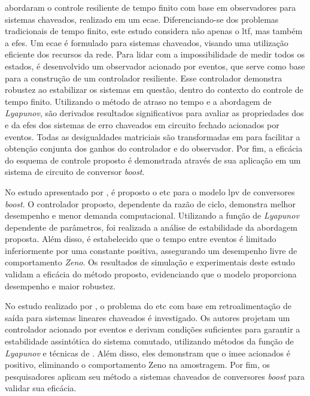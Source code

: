 \cite{Ren2018} abordaram o controle resiliente de tempo finito com base em observadores para sistemas chaveados, realizado em um \acrfull{ecae}. Diferenciando-se dos problemas tradicionais de tempo finito, este estudo considera não apenas o \acrfull{ltf}, mas também a \acrfull{efes}. Um \acrshort{ecae} é formulado para sistemas chaveados, visando uma utilização eficiente dos recursos da rede. Para lidar com a impossibilidade de medir todos os estados, é desenvolvido um observador acionado por eventos, que serve como base para a construção de um controlador resiliente. Esse controlador demonstra robustez ao estabilizar os sistemas em questão, dentro do contexto do controle de tempo finito. Utilizando o método de atraso no tempo e a abordagem de \textit{Lyapunov}, são derivados resultados significativos para avaliar as propriedades dos  e da \acrshort{efes} dos sistemas de erro chaveados em circuito fechado acionados por eventos. Todas as desigualdades matriciais são transformadas em  para facilitar a obtenção conjunta dos ganhos do controlador e do observador. Por fim, a eficácia do esquema de controle proposto é demonstrada através de sua aplicação em um sistema de circuito de conversor \textit{boost}.

No estudo apresentado por \cite{Soni2023}, é proposto o \acrshort{etc} para o modelo \acrshort{lpv} de conversores \textit{boost}. O controlador proposto, dependente da razão de ciclo, demonstra melhor desempenho e menor demanda computacional. Utilizando a função de \textit{\textit{Lyapunov }} dependente de parâmetros, foi realizada a análise de estabilidade da abordagem proposta. Além disso, é estabelecido que o tempo entre eventos é limitado inferiormente por uma constante positiva, assegurando um desempenho livre de comportamento \textit{Zeno}. Os resultados de simulação e experimentais deste estudo validam a eficácia do método proposto, evidenciando que o modelo proporciona desempenho e maior robustez.

No estudo realizado por \cite{Ma2016}, o problema do \acrshort{etc} com base em retroalimentação de saída para sistemas lineares chaveados é investigado. Os autores projetam um controlador acionado por eventos e derivam condições suficientes para garantir a estabilidade assintótica do sistema comutado, utilizando métodos da função de \textit{Lyapunov }e técnicas de . Além disso, eles demonstram que o \acrshort{imee} acionados é positivo, eliminando o comportamento Zeno na amostragem. Por fim, os pesquisadores aplicam seu método a sistemas chaveados de conversores \textit{boost} para validar sua eficácia.


